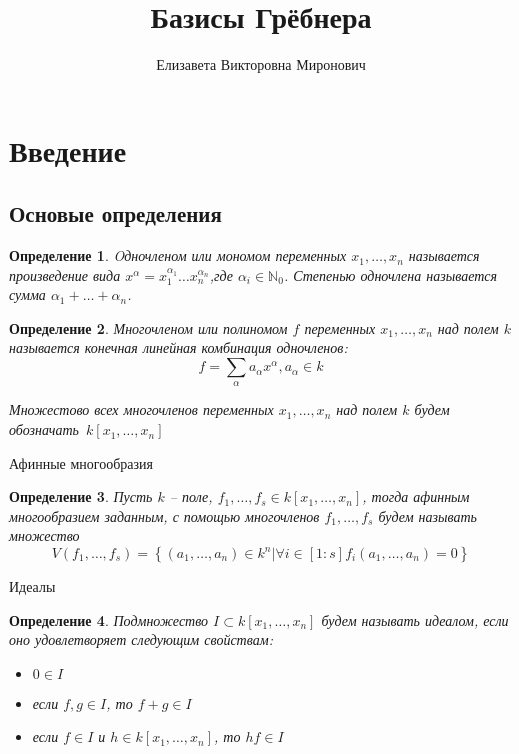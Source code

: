 \documentclass[notheorems,aspectratio=169]{beamer}
\title{Базисы Грёбнера}
\author{Елизавета Викторовна Миронович}
\institute[344 группа]{344 группа \\ Лаборатория распознавания изображений \\  СПбГУ}
\newtheorem{definition}{Определение}
\begin{document}
\begin{frame}
  \maketitle
\end{frame}

\section{Введение}
\subsection{Основые определения}
\begin{frame}
    \begin{definition}
    Oдночленом или мономом переменных $x_1, \dots, x_n$ называется произведение вида $x^\alpha = x_1^{\alpha_1} \dots x_n^{\alpha_n} $,где $\alpha_i \in \mathbb{N}_0$. Степенью одночлена называется сумма $\alpha_1 + \dots + \alpha_n$.
    \end{definition}
    
    \begin{definition}
    Многочленом или полиномом  $f$ переменных $x_1, \dots, x_n$ над полем $k$ называется конечная линейная комбинация одночленов:
    $$
        f = \sum_\alpha a_\alpha x^\alpha, a_\alpha \in k
    $$
    
    Множестово всех многочленов переменных  $x_1, \dots, x_n$ над полем $k$ будем обозначать~$k[x_1, \dots, x_n]$ 
    \end{definition}
\end{frame}

\begin{frame}{Афинные многообразия}
    \begin{definition}
        Пусть $k$ -- поле, $f_1, \dots, f_s \in k[x_1, \dots, x_n]$, тогда афинным многообразием  заданным, с помощью многочленов $f_1, \dots, f_s$ будем называть множество
    $$
        V(f_1,\dots, f_s) = \left\{(a_1,\dots,a_n)\in k^n | \forall i\in [1:s]   f_i(a_1, \dots, a_n) = 0\right\}
    $$
    \end{definition}
\end{frame}

\begin{frame}{Идеалы}
    \begin{definition}
        Подмножество $I \subset k[x_1, \dots, x_n]$ будем называть идеалом, если оно удовлетворяет следующим свойствам:
        \begin{itemize}
            \item [(i)] $0 \in I$
            \item [(ii)] если $f, g \in I$, то $f + g \in I$
            \item [(iii)] если $f \in I$ и $h \in k[x_1, \dots, x_n]$, то $hf \in I$
        \end{itemize}
    \end{definition}
\end{frame}
\end{document}
